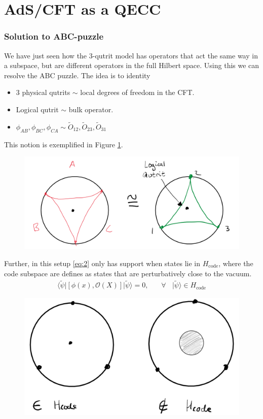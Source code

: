 \documentclass[letter,12pt]{article}
\newcommand{\BO}{\mathcal{O}}
\begin{document}
\section{AdS/CFT as a QECC}
\subsubsection*{Solution to ABC-puzzle}
We have just seen how the 3-qutrit model has operators that act the same way in a subspace, but are different operators in the full Hilbert space. Using this we can resolve the ABC puzzle. The idea is to identity 
\begin{itemize}
	\item 3 physical qutrits $\sim$ local degrees of freedom in the CFT.
	\item Logical qutrit $\sim$ bulk operator.
	\item $\phi_{AB},\phi_{BC},\phi_{CA}\sim \tilde{O}_{12},\tilde{O}_{23},\tilde{O}_{31}$
\end{itemize}
This notion is exemplified in Figure \ref{fig:adscftfig5}.
\begin{figure}[H]
	\centering
	\includegraphics[width=0.95\linewidth]{ADS_CFT_Fig5}
	\caption{}
	\label{fig:adscftfig5}
\end{figure}
Further, in this setup \eqref{eq:2} only has support when states lie in $H_{\text{code}}$, where the code subspace are defines as states that are perturbatively close to the vacuum.
\begin{equation}
	\begin{aligned}
		\langle \tilde \psi |\left[\phi(x),\BO(X)\right]|\tilde \psi\rangle =0,~~~~~~~~\forall~~~~ |\tilde \psi\rangle\in H_{\text{code}}
	\end{aligned}
\end{equation}
\begin{figure}[]
	\centering
	\includegraphics[width=0.7\linewidth]{ADS_CFT_Fig6}
	\caption{}
	\label{fig:adscftfig6}
\end{figure}
\end{document}
